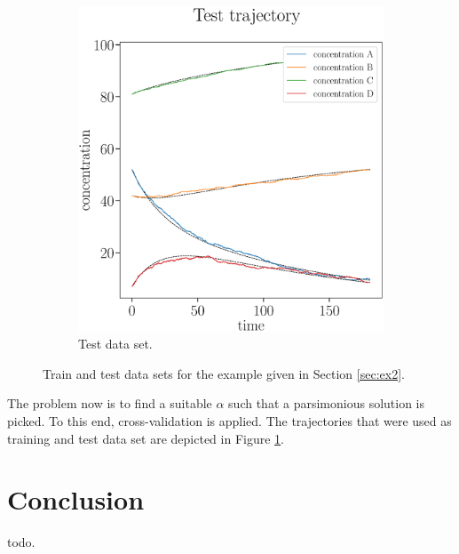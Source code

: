 \documentclass[oneside, abstracton, titlepage]{scrartcl}
\begin{document}
\begin{figure}
\begin{subfigure}[b]{.45\textwidth}
			\includegraphics[width=\textwidth]{./figures_tex/cv_concentrations_test}
			\caption{Test data set.}
		\end{subfigure}
		\caption{Train and test data sets for the example given in Section \ref{sec:ex2}.}
		\label{ex2:test-train-concentration-curves}
	\end{figure}
	
	The problem now is to find a suitable $\alpha$ such that a parsimonious solution is picked. To this end, cross-validation is applied. The trajectories that were used as training and test data set are depicted in Figure \ref{ex2:test-train-concentration-curves}.
	
	\section{Conclusion}
	todo.
	
	
	\newpage
% 	
	
	
	
\end{document}
